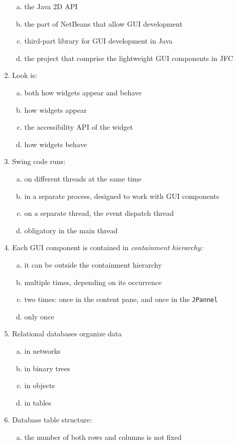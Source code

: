 \documentclass[10pt,a4paper,twocolumn]{article}
\begin{document}
\begin{enumerate}
\begin{enumerate}[(a)]
	\item the Java 2D API
	\item the part of NetBeans that allow GUI development
	\item third-part library for GUI development in Java
	\item the project that comprise the lightweight GUI components in JFC
\end{enumerate}
\item Look is:
\begin{enumerate}[(a)]
	\item both how widgets appear and behave
	\item how widgets appear
	\item the accessibility API of the widget
	\item how widgets behave
\end{enumerate}
\item Swing code runs:
\begin{enumerate}[(a)]
	\item on different threads at the same time
	\item in a separate process, designed to work with GUI components
	\item on a separate thread, the event dispatch thread
	\item obligatory in the main thread
\end{enumerate}
\item Each GUI component is contained in \textit{containment hierarchy:}
\begin{enumerate}[(a)]
	\item it can be outside the containment hierarchy
	\item multiple times, depending on its occurrence
	\item two times: once in the content pane, and once in the \texttt{JPannel}
	\item only once
\end{enumerate}
\item Relational databases organize data
\begin{enumerate}[(a)]
	\item in networks
	\item in binary trees
	\item in objects
	\item in tables
\end{enumerate}
\item Database table structure:
\begin{enumerate}[(a)]
	\item the number of both rows and columns is not fixed

\end{enumerate}
\end{enumerate}
\end{document}

